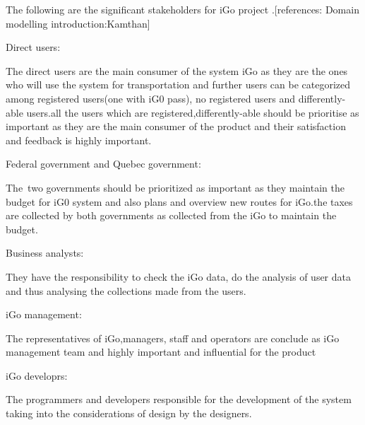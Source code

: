 \documentclass[12pt]{report}
\begin{document}
\vspace{\baselineskip}
The following are the significant stakeholders for iGo project .[references: Domain modelling introduction:Kamthan]\par



\vspace{\baselineskip}
Direct users:\par

The direct users are the main consumer of the system iGo as they are the ones who will use the system for transportation and further users can be categorized among registered users(one with iG0 pass), no registered users and differently-able users.all the users which are registered,differently-able should be prioritise as important as they are the main consumer of the product and their satisfaction and feedback is highly important.\par


\vspace{\baselineskip}
Federal government and Quebec government:\par

The\ two governments should be prioritized as important as they maintain the budget for iG0 system and also plans and overview new routes for  iGo.the taxes are collected by both governments as collected from the iGo to maintain the budget.\par


\vspace{\baselineskip}

Business analysts:\par

They have the responsibility to check the iGo data, do the analysis of user data and thus analysing the collections made from the users.\par


\vspace{\baselineskip}
iGo management:\par

The representatives of iGo,managers, staff and operators are conclude as iGo management team and highly important and influential for the product\par


\vspace{\baselineskip}
iGo developrs:\par

The programmers and developers responsible for the development of the system taking into the considerations of design by the designers.\par
\end{document}
